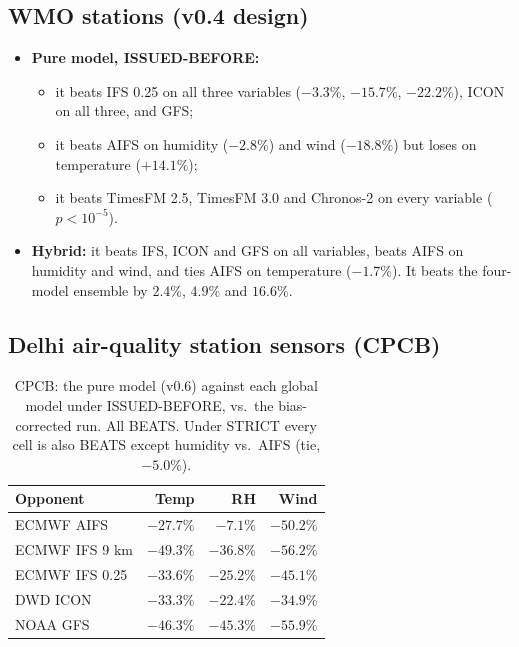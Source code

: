 \subsection{WMO stations (v0.4 design)}

\begin{itemize}
\item \textbf{Pure model, ISSUED-BEFORE:}
\begin{itemize}
\item it beats IFS 0.25 on all three variables ($-3.3\%$, $-15.7\%$, $-22.2\%$), ICON on all three, and GFS;
\item it beats AIFS on humidity ($-2.8\%$) and wind ($-18.8\%$) but loses on temperature ($+14.1\%$);
\item it beats TimesFM 2.5, TimesFM 3.0 and Chronos-2 on every variable ($p<10^{-5}$).
\end{itemize}
\item \textbf{Hybrid:} it beats IFS, ICON and GFS on all variables, beats AIFS on humidity and wind, and ties AIFS on
temperature ($-1.7\%$). It beats the four-model ensemble by $2.4\%$, $4.9\%$ and $16.6\%$.
\end{itemize}

\subsection{Delhi air-quality station sensors (CPCB)}

\begin{table}[t]
\caption{CPCB: the pure model (v0.6) against each global model under ISSUED-BEFORE, vs.\ the bias-corrected run.
All BEATS. Under STRICT every cell is also BEATS except humidity vs.\ AIFS (tie, $-5.0\%$).}
\label{tab:cpcb_global}
\small
\begin{tabular}{@{}lrrr@{}}
\toprule
Opponent & Temp & RH & Wind \\
\midrule
ECMWF AIFS & $-27.7\%$ & $-7.1\%$ & $-50.2\%$ \\
ECMWF IFS 9 km & $-49.3\%$ & $-36.8\%$ & $-56.2\%$ \\
ECMWF IFS 0.25 & $-33.6\%$ & $-25.2\%$ & $-45.1\%$ \\
DWD ICON & $-33.3\%$ & $-22.4\%$ & $-34.9\%$ \\
NOAA GFS & $-46.3\%$ & $-45.3\%$ & $-55.9\%$ \\
\bottomrule
\end{tabular}
\end{table}

